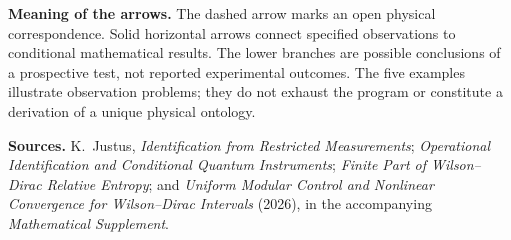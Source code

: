 \documentclass[10pt,a4paper]{article}
\begin{document}
\vspace{4mm}
{\small\textbf{Meaning of the arrows.} The dashed arrow marks an open physical correspondence. Solid horizontal arrows connect specified observations to conditional mathematical results. The lower branches are possible conclusions of a prospective test, not reported experimental outcomes. The five examples illustrate observation problems; they do not exhaust the program or constitute a derivation of a unique physical ontology.}\par
\vspace{3mm}
{\footnotesize\textbf{Sources.} K.~Justus, \emph{Identification from Restricted Measurements}; \emph{Operational Identification and Conditional Quantum Instruments}; \emph{Finite Part of Wilson--Dirac Relative Entropy}; and \emph{Uniform Modular Control and Nonlinear Convergence for Wilson--Dirac Intervals} (2026), in the accompanying \emph{Mathematical Supplement}.}
\end{document}
